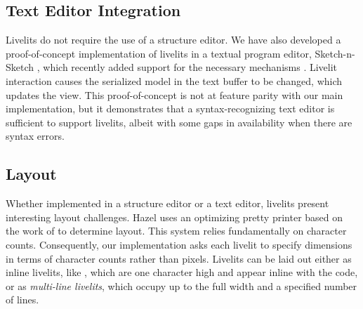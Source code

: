 
\subsection{Text Editor Integration}
Livelits do not require the use of a structure editor. 
We have also developed a 
proof-of-concept implementation of livelits in a textual program editor, Sketch-n-Sketch \cite{sns-pldi,sns-uist},
which recently added support for the necessary mechanisms \cite{DBLP:journals/pacmpl/LubinCOC20}.
Livelit interaction causes the serialized model in the text buffer to be changed, which updates the view.
This proof-of-concept is not at feature parity with 
our main implementation, but it demonstrates that a syntax-recognizing text editor \cite{DBLP:journals/tosem/BallanceGV92,DBLP:conf/sde/HorganM84,interactive-visual-syntax} 
is sufficient to support livelits, albeit with some gaps in availability when 
there are syntax errors.

\subsection{Layout}\label{sec:layout}
Whether implemented in a structure editor or a text editor, livelits present 
interesting layout challenges. 
Hazel uses an optimizing pretty printer based on the work of \citet{DBLP:journals/pacmpl/Bernardy17} to determine layout. This system relies 
fundamentally on character counts. Consequently, our implementation asks each 
livelit to specify dimensions in terms of character counts rather than pixels.
Livelits can be laid out either as inline livelits, like ,
which are one character high and appear inline with the code,
or as \emph{multi-line livelits}, which occupy up to the full width 
and a specified number of lines. %


